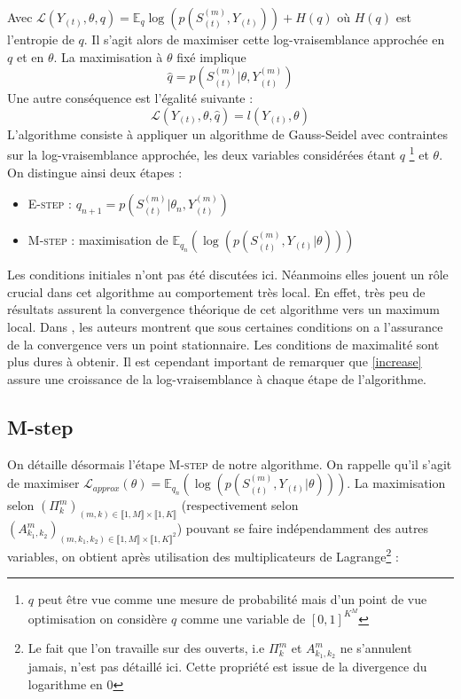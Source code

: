 \documentclass[10pt,a4paper]{article}
\newcommand{\Estep}{\textsc{E-step}}
\newcommand{\Mstep}{\textsc{M-step}}
\begin{document}
Avec $\mathcal{L}(Y_{(t)},\theta,q)=\mathbb{E}_q \log \left( p(S_{(t)}^{(m)}, 
Y_{(t)})\right)+H(q)$ où $H(q)$ est l'entropie de $q$. Il s'agit alors de 
maximiser cette log-vraisemblance approchée en $q$ et en $\theta$. La 
maximisation à $\theta$ fixé implique 
\begin{equation}
\hat{q}=p(S_{(t)}^{(m)} \vert \theta,Y_{(t)}^{(m)})
\end{equation} 
Une autre conséquence est l'égalité suivante :
\begin{equation}
\mathcal{L}(Y_{(t)},\theta,\hat{q})=l(Y_{(t)},\theta) \label{increase}
\end{equation}
L'algorithme consiste à appliquer un algorithme de Gauss-Seidel avec 
contraintes sur la log-vraisemblance approchée, les deux variables considérées 
étant $q$ \footnote{$q$ peut être vue comme une mesure de probabilité mais d'un 
point de vue optimisation on considère $q$ comme une variable de $[0,1]^{K^M}$} 
et $\theta$. On distingue ainsi deux étapes :
\begin{itemize}
\item \Estep{} : $q_{n+1}=p(S_{(t)}^{(m)} \vert \theta_n,Y_{(t)}^{(m)})$
\item \Mstep{} : maximisation de $\mathbb{E}_{q_n} \left( \log \left( 
p(S_{(t)}^{(m)}, Y_{(t)}  \vert  \theta )\right) \right)$
\end{itemize}
Les conditions initiales n'ont pas été discutées ici. Néanmoins elles jouent un 
rôle crucial dans cet algorithme au comportement très local. En effet, très peu 
de résultats assurent la convergence théorique de cet algorithme vers un 
maximum local. Dans \cite{wu1983convergence}, les auteurs montrent que sous 
certaines conditions on a l'assurance de la convergence vers un point 
stationnaire. Les conditions de maximalité sont plus dures à obtenir. Il est 
cependant important de remarquer que \ref{increase} assure une croissance de la 
log-vraisemblance à chaque étape de l'algorithme.

\subsection{M-step}
On détaille désormais l'étape \Mstep{} de notre algorithme.
On rappelle qu'il s'agit de maximiser
$\mathcal{L}_{approx}(\theta)=\mathbb{E}_{q_n}
\left( \log \left( p(S_{(t)}^{(m)},Y_{(t)}\vert \theta)\right)\right)$.
La maximisation selon
$(\Pi_{k}^m)_{(m,k) \in
\llbracket 1,M \rrbracket \times \llbracket 1,K \rrbracket}$
(respectivement selon
$(A_{k_1,k_2}^m)_{(m,k_1,k_2) \in
\llbracket 1,M \rrbracket \times \llbracket 1,K \rrbracket^2}$) pouvant se faire 
indépendamment des autres variables, on obtient après utilisation des 
multiplicateurs de Lagrange\footnote{Le fait que l'on travaille sur des 
ouverts, i.e $\Pi_{k}^m$ et $A_{k_1,k_2}^m$ ne s'annulent jamais, n'est pas 
détaillé ici. Cette propriété est issue de la divergence du logarithme en $0$} :
\end{document}
